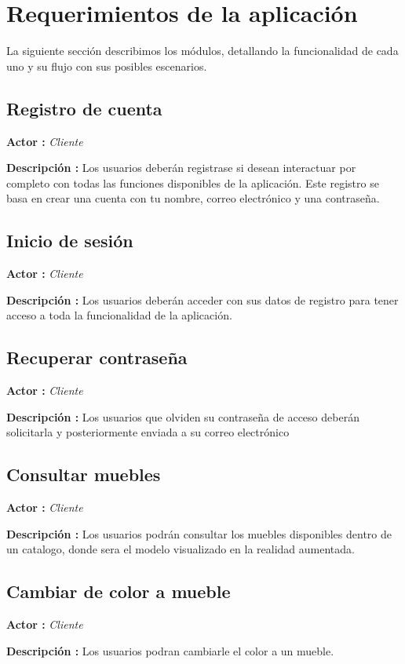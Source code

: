 \section{Requerimientos de la aplicación}
La siguiente sección describimos los módulos, detallando la funcionalidad de cada uno y su flujo con sus posibles escenarios.\par

\subsection{Registro de cuenta}
\textbf{Actor :} \textit{Cliente} \par
\textbf{Descripción :} Los usuarios deberán registrase si desean interactuar por completo con todas las funciones disponibles de la aplicación. Este registro se basa en crear una cuenta con tu nombre, correo electrónico y una contraseña.
\subsection{Inicio de sesión}
\textbf{Actor :} \textit{Cliente} \par
\textbf{Descripción :} Los usuarios deberán acceder con sus datos de registro para tener acceso a toda la funcionalidad de la aplicación.
\subsection{Recuperar contraseña}
\textbf{Actor :} \textit{Cliente} \par
\textbf{Descripción :} Los usuarios que olviden su contraseña de acceso deberán solicitarla y posteriormente enviada a su correo electrónico

\subsection{Consultar muebles}
\textbf{Actor :} \textit{Cliente} \par
\textbf{Descripción :} Los usuarios podrán consultar los muebles disponibles dentro de un catalogo, donde sera el modelo visualizado en la realidad aumentada.

\subsection{Cambiar de color a mueble}
\textbf{Actor :} \textit{Cliente} \par
\textbf{Descripción :} Los usuarios podran cambiarle el color a un mueble.

